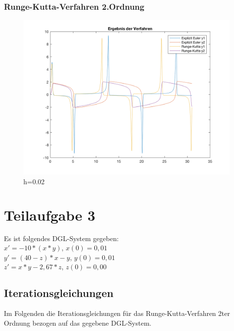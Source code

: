 \documentclass[]{scrartcl}
\begin{document}
\subsubsection{Runge-Kutta-Verfahren 2.Ordnung}
\begin{figure}[H]
	\centering
	\includegraphics[width=1\linewidth]{a1_2_2}
	\caption{h=0.02}
	\label{fig:a1_2_2}
\end{figure}

\section{Teilaufgabe 3}
Es ist folgendes DGL-System gegeben: \\
$x' = -10 * (x*y)$, $x(0) = 0,01$ \\
$y' = (40 - z) * x - y$, $y(0) = 0,01$ \\
$z' = x * y - 2,67 * z$, $z(0) = 0,00$ \\


\subsection{Iterationsgleichungen}
Im Folgenden die Iterationsgleichungen für das Runge-Kutta-Verfahren 2ter Ordnung bezogen auf das gegebene DGL-System.
\end{document}
